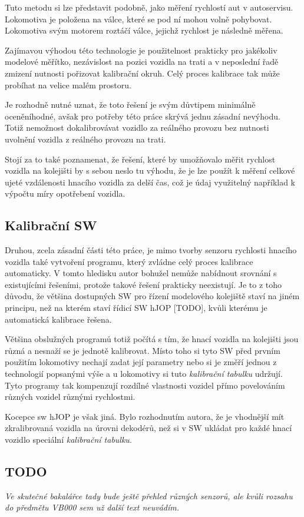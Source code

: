 \documentclass[12pt,a4paper]{article}
\begin{document}
Tuto metodu si lze představit podobně, jako měření rychlostí aut v autoservisu.
Lokomotiva je položena na válce, které se pod ní mohou volně pohybovat. Lokomotiva
svým motorem roztáčí válce, jejichž rychlost je následně měřena.

Zajímavou výhodou této technologie je použitelnost prakticky pro jakékoliv
modelové měřítko, nezávislost na pozici vozidla na trati a v neposlední řadě
zmizení nutnosti pořizovat kalibrační okruh. Celý proces kalibrace tak může
probíhat na velice malém prostoru.

Je rozhodně nutné uznat, že toto řešení je svým důvtipem minimálně oceněníhodné,
avšak pro potřeby této práce skrývá jednu zásadní nevýhodu. Totiž nemožnost
dokalibrovávat vozidlo za reálného provozu bez nutnosti uvolnění vozidla
z reálného provozu na trati.

Stojí za to také poznamenat, že řešení, které by umožňovalo měřit rychlost vozidla
na kolejišti by s sebou neslo tu výhodu, že je lze použít k měření celkové
ujeté vzdálenosti hnacího vozidla za delší čas, což je údaj využitelný například
k výpočtu míry opotřebení vozidla.

\subsection{Kalibrační SW}

Druhou, zcela zásadní části této práce, je mimo tvorby senzoru rychlosti hnacího
vozidla také vytvoření programu, který zvládne celý proces kalibrace automaticky.
V tomto hledisku autor bohužel nemůže nabídnout srovnání s existujícími řešeními,
protože takové řešení prakticky neexistují. Je to z toho důvodu, že většina
dostupných SW pro řízení modelového kolejiště staví na jiném principu, než na
kterém staví řídicí SW hJOP [TODO], kvůli kterému je automatická kalibrace
řešena.

Většina obslužných programů totiž počítá s tím, že hnací vozidla na kolejišti
jsou různá a nesnaží se je jednotě kalibrovat. Místo toho si tyto SW před prvním
použitím lokomotivy nechají zadat její parametry nebo si je změří jednou
z technologií popsanými výše a u lokomotivy si tuto \textit{kalibrační tabulku}
udržují. Tyto programy tak kompenzují rozdílné vlastnosti vozidel přímo povelováním
různých vozidel různými rychlostmi.

Kocepce sw hJOP je však jiná. Bylo rozhodnutím autora, že je vhodnější mít
zkralibrovaná vozidla na úrovni dekodérů, než si v SW ukládat pro každé hnací
vozidlo speciální \textit{kalibrační tabulku}.

\subsection{TODO}

\textit{Ve skutečné bakalářce tady bude ještě přehled různých senzorů, ale
kvůli rozsahu do předmětu VB000 sem už další text neuvádím.}
\end{document}
